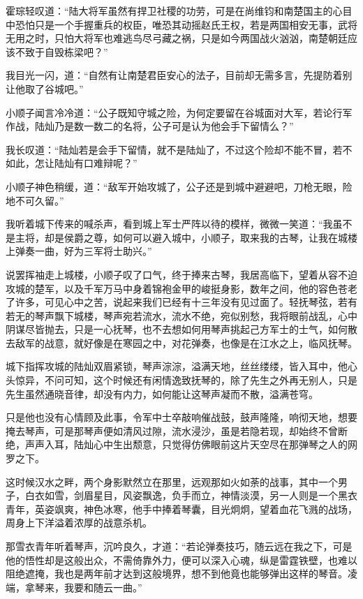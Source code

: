 霍琮轻叹道：“陆大将军虽然有捍卫社稷的功劳，可是在尚维钧和南楚国主的心目中恐怕只是一个手握重兵的权臣，唯恐其动摇赵氏王权，若是两国相安无事，武将无用之时，只怕大将军也难逃鸟尽弓藏之祸，只是如今两国战火汹汹，南楚朝廷应该不致于自毁栋梁吧？”

我目光一闪，道：“自然有让南楚君臣安心的法子，目前却无需多言，先提防着别让他取了谷城吧。”

小顺子闻言冷冷道：“公子既知守城之险，为何定要留在谷城面对大军，若论行军作战，陆灿乃是数一数二的名将，公子可是认为他会手下留情么？”

我长叹道：“陆灿若是会手下留情，就不是陆灿了，不过这个险却不能不冒，若不如此，怎让陆灿有口难辩呢？”

小顺子神色稍缓，道：“敌军开始攻城了，公子还是到城中避避吧，刀枪无眼，险地不可久留。”

我听着城下传来的喊杀声，看到城上军士严阵以待的模样，微微一笑道：“我虽不是主将，却是侯爵之尊，如何可以避入城中，小顺子，取来我的古琴，让我在城楼上弹奏一曲，好为三军将士助兴。”

说罢挥袖走上城楼，小顺子叹了口气，终于捧来古琴，我居高临下，望着从容不迫攻城的楚军，以及千军万马中身着锦袍金甲的峻挺身影，数年之间，他的容色苍老了许多，可见心中之苦，说起来我们已经有十三年没有见过面了。轻抚琴弦，若有若无的琴声飘下城楼，琴声宛若流水，流水不绝，宛似别愁，我将眼前战乱，心中阴谋尽皆抛去，只是一心抚琴，也不去想如何用琴声挑起己方军士的士气，如何散去敌军的战意，就好像是在寒园之中，对花弹奏，也像是在江水之上，临风抚琴。

城下指挥攻城的陆灿双眉紧锁，琴声淙淙，溢满天地，丝丝缕缕，皆入耳中，他心头惊异，不问可知，这个时候还有闲情逸致抚琴的，除了先生之外再无别人，只是先生虽然通晓音律，却没有内力，如何能让这琴声凝而不散，溢满苍穹。

只是他也没有心情顾及此事，令军中士卒敲响催战鼓，鼓声隆隆，响彻天地，想要掩去琴声，可是那琴声便如清风过隙，流水浸沙，虽是若隐若现，却始终不曾断绝，声声入耳，陆灿心中生出颓意，只觉得仿佛眼前这片天空尽在那弹琴之人的网罗之下。

这时候汉水之畔，两个身影默然立在那里，远观那如火如荼的战事，其中一个男子，白衣如雪，剑眉星目，风姿飘逸，负手而立，神情淡漠，另一人则是一个黑衣青年，英姿飒爽，神色冰寒，他手中捧着琴囊，目光炯炯，望着血花飞溅的战场，周身上下洋溢着浓厚的战意杀机。

那雪衣青年听着琴声，沉吟良久，才道：“若论弹奏技巧，随云远在我之下，可是他的悟性却是这般出众，不需倚靠外力，便可以深入心魂，纵是雷霆铁壁，也难以阻绝遮掩，我也是两年前才达到这般境界，想不到他竟也能够弹出这样的琴音。凌端，拿琴来，我要和随云一曲。”

